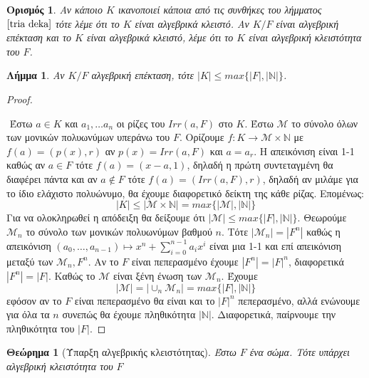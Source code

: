 \documentclass[oneside,a4paper]{article}
\newtheorem{theorem}{Θεώρημα}
\newtheorem{lemma}{Λήμμα}
\newtheorem*{defn}{Ορισμός}
\begin{document}
\begin{defn} Αν κάποιο $K$ ικανοποιεί κάποια από τις συνθήκες του λήμματος $\ref{tria deka}$ τότε λέμε ότι το $K$ είναι αλγεβρικά κλειστό. Αν $K/F$ είναι αλγεβρική επέκταση και το $K$ είναι αλγεβρικά κλειστό, λέμε ότι το $K$ είναι αλγεβρική κλειστότητα του $F$.
\end{defn}

\begin{lemma}
	Αν $K/F$ αλγεβρική επέκταση, τότε $|K| \leq max\{|F| , |\mathbb N|\}$.
\end{lemma}
\begin{proof} $ $

	$ $\newline
	Έστω $a \in K$ και $a_1 ,\ldots a_n$ οι ρίζες του $Irr(a,F)$ στο $K$. Έστω $\mathcal M$ το σύνολο όλων των μονικών πολυωνύμων υπεράνω του $F$. Ορίζουμε $f: K \rightarrow \mathcal M \times \mathbb N$ με $f(a) = (p(x),r)$ αν $p(x) = Irr(a,F)$ και $a = a_r$. Η απεικόνιση είναι 1-1 καθώς αν $a \in F$ τότε $f(a) = (x-a,1)$, δηλαδή η πρώτη συντεταγμένη θα διαφέρει πάντα και αν $a \not\in F$ τότε $f(a) = (Irr(a,F),r)$, δηλαδή αν μιλάμε για το ίδιο ελάχιστο πολυώνυμο, θα έχουμε διαφορετικό δείκτη της κάθε ρίζας. Επομένως:
	$$|K| \leq |\mathcal M \times \mathbb N | = max\{|\mathcal M |, |\mathbb{N}|\}$$ 
	Για να ολοκληρωθεί η απόδειξη θα δείξουμε ότι $|\mathcal M| \leq max\{|F|, |\mathbb N |\}$. Θεωρούμε $\mathcal{M}_n$ το σύνολο των μονικών πολυωνύμων βαθμού $n$. Τότε $|\mathcal{M}_n| = |F^n|$ καθώς η απεικόνιση $(a_0 ,\ldots,a_{n-1}) \mapsto x^n + \sum\limits_{i=0}^{n-1} a_i x^i$ είναι μια 1-1 και επί απεικόνιση μεταξύ των $\mathcal{M}_n, F^n$. Αν το $F$ είναι πεπερασμένο έχουμε $|F^n| = |F|^n$, διαφορετικά $|F^n| = |F|$. Καθώς το $\mathcal M$ είναι ξένη ένωση των $\mathcal{M}_n$. Έχουμε 
	$$|\mathcal M| = |\cup_n \mathcal{M}_n | = max\{|F|,|\mathbb N | \}$$
	εφόσον αν το $F$ είναι πεπερασμένο θα είναι και το $|F|^n$ πεπερασμένο, αλλά ενώνουμε για όλα τα $n$ συνεπώς θα έχουμε πληθικότητα $|\mathbb{N}|$. Διαφορετικά, παίρνουμε την πληθικότητα του $|F|$.
\end{proof}


\begin{theorem}[Ύπαρξη αλγεβρικής κλειστότητας]
	Έστω $F$ ένα σώμα. Τότε υπάρχει αλγεβρική κλειστότητα του $F$
\end{theorem}
\end{document}
